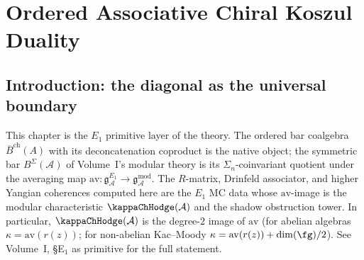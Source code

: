 
\providecommand{\Assch}{\mathrm{Ass}^{\mathrm{ch}}}
\providecommand{\Barch}{\overline{B}^{\mathrm{ch}}}
\providecommand{\Barchord}{\overline{B}^{\mathrm{ord}}}
\providecommand{\Cobar}{\Omega^{\mathrm{ch}}}
\providecommand{\coHoch}{\operatorname{coHH}}
\providecommand{\Cotor}{\operatorname{Cotor}}
\providecommand{\Def}{\operatorname{Def}}
\providecommand{\Coext}{\operatorname{Coext}}
\providecommand{\RHom}{R\!\operatorname{Hom}}
\providecommand{\Tot}{\operatorname{Tot}}
\providecommand{\KK}{\mathbb{K}}
\providecommand{\Dpbw}{D^{\mathrm{pbw}}}
\providecommand{\Dco}{D^{\mathrm{co}}}
\providecommand{\chotimes}{\mathbin{\otimes^{\mathrm{ch}}}}
\providecommand{\wt}{\widetilde}
\providecommand{\eps}{\varepsilon}
\providecommand{\susp}{s}
\providecommand{\coeq}{\operatorname{coeq}}
\providecommand{\id}{\mathrm{id}}
\providecommand{\op}{\mathrm{op}}
\providecommand{\cop}{\mathrm{cop}}
\providecommand{\HH}{\operatorname{HH}}
\providecommand{\Tor}{\operatorname{Tor}}
\providecommand{\Ext}{\operatorname{Ext}}
\providecommand{\gr}{\operatorname{gr}}
\providecommand{\MC}{\operatorname{MC}}
\providecommand{\Ob}{\operatorname{Ob}}
\providecommand{\eq}{\operatorname{eq}}
\providecommand{\cF}{\mathcal{F}}
\providecommand{\cL}{\mathcal{L}}
\providecommand{\cA}{\mathcal{A}}

\chapter{Ordered Associative Chiral Koszul Duality}
\label{ch:ordered-associative-chiral-kd}
\label{chap:ordered-associative}%
\label{ch:ordered-chiral}%

\section{Introduction: the diagonal as the universal boundary}

\begin{remark}
\label{rem:ordered-kd-e1-primitive}
This chapter is the $E_1$ primitive layer of the theory.
The ordered bar coalgebra $\Barch(A)$ with its deconcatenation coproduct
is the native object; the symmetric bar $B^{\Sigma}(\cA)$ of Volume~I's
modular theory is its $\Sigma_n$-coinvariant quotient under the
averaging map $\mathrm{av}\colon \mathfrak{g}^{E_1}_\cA \to
\mathfrak{g}^{\mathrm{mod}}_\cA$.
The $R$-matrix, Drinfeld associator, and higher Yangian coherences
computed here are the $E_1$ MC data whose $\mathrm{av}$-image is
the modular characteristic $\kappaChHodge(\cA)$ and the shadow obstruction tower.
In particular, $\kappaChHodge(\cA)$ is the degree-$2$ image of $\mathrm{av}$
(for abelian algebras $\kappa = \mathrm{av}(r(z))$;
for non-abelian Kac--Moody
$\kappa = \mathrm{av}(r(z)) + \dim(\fg)/2$).
See Volume~I, \S\textup{E$_1$ as primitive}
for the full statement.
\end{remark}

